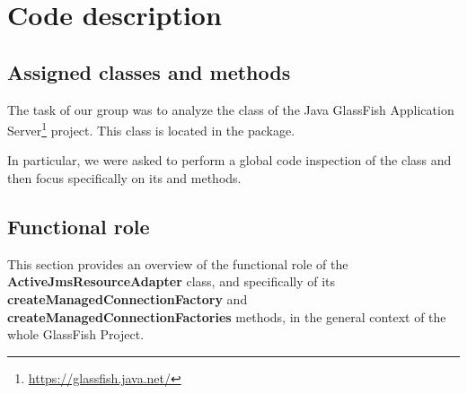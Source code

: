 \chapter{Code description}
\section{Assigned classes and methods}
The task of our group was to analyze the  class of the Java GlassFish Application Server\footnote{\url{https://glassfish.java.net/}} project. This class is located in the  package. 

In particular, we were asked to perform a global code inspection of the class and then focus specifically on its  and  methods. 
\section{Functional role}
This section provides an overview of the functional role of the \textbf{ActiveJmsResourceAdapter} class, and specifically of its \textbf{createManagedConnectionFactory} and \textbf{createManagedConnectionFactories} methods, in the general context of the whole GlassFish Project.

